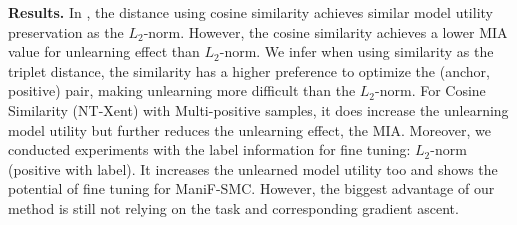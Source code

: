 \noindent
\textbf{Results.}
In , the distance using cosine similarity achieves similar model utility preservation as the $L_2$-norm. However, the cosine similarity achieves a lower MIA value for unlearning effect than $L_2$-norm. We infer when using similarity as the triplet distance, the similarity has a higher preference to optimize the (anchor, positive) pair, making unlearning more difficult than the $L_2$-norm. For Cosine Similarity (NT-Xent) with Multi-positive samples, it does increase the unlearning model utility but further reduces the unlearning effect, the MIA. Moreover, we conducted experiments with the label information for fine tuning: $L_2$-norm (positive with label). It increases the unlearned model utility too and shows the potential of fine tuning for ManiF-SMC. However, the biggest advantage of our method is still not relying on the task and corresponding gradient ascent.


\begin{table}[t]
	\caption{Evaluation of Different Distance Metrics for ManiF-SMC on MNIST. 
	}
	\vspace{-2mm}
	\label{Different_Distance_Metrics}
 
\end{table} 


